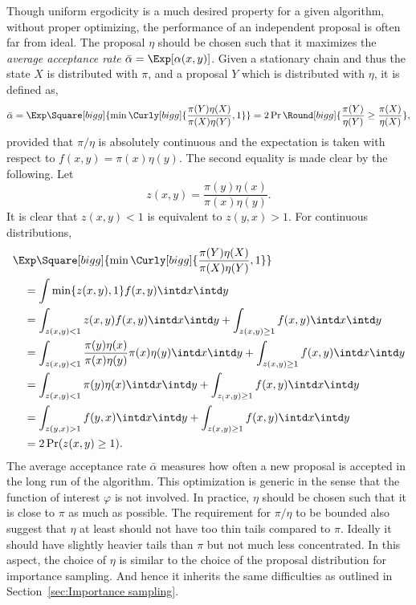 Though uniform ergodicity is a much desired property for a given algorithm,
without proper optimizing, the performance of an independent proposal is often
far from ideal. The proposal $\eta$ should be chosen such that it maximizes the
\emph{average acceptance rate} $\bar\alpha = \Exp[\alpha(x,y)]$. Given a
stationary chain and thus the state $X$ is distributed with $\pi$, and a
proposal $Y$ which is distributed with $\eta$, it is defined as,
\begin{equation}
  \bar\alpha
  = \Exp\Square[bigg]{\min\Curly[bigg]{\frac{\pi(Y)\eta(X)}{\pi(X)\eta(Y)},1}}
  = 2\Pr\Round[bigg]{\frac{\pi(Y)}{\eta(Y)}\ge\frac{\pi(X)}{\eta(X)}},
\end{equation}
provided that $\pi/\eta$ is absolutely continuous and the expectation is taken
with respect to $f(x,y) = \pi(x)\eta(y)$. The second equality is made clear by
the following. Let
\begin{equation*}
  z(x,y) = \frac{\pi(y)\eta(x)}{\pi(x)\eta(y)}.
\end{equation*}
It is clear that $z(x,y) < 1$ is equivalent to $z(y,x)>1$. For continuous
distributions,
\begin{align*}
  &\Exp\Square[bigg]{\min\Curly[bigg]{\frac{\pi(Y)\eta(X)}{\pi(X)\eta(Y)},1}}
  \\
  &\quad= \int \min\{z(x,y),1\} f(x,y)\intd x \intd y \\
  &\quad= \int_{z(x,y) < 1} z(x,y)f(x,y) \intd x \intd y
  + \int_{z(x,y)\ge1} f(x,y)\intd x \intd y \\
  &\quad= \int_{z(x,y) < 1} \frac{\pi(y)\eta(x)}{\pi(x)\eta(y)}
  \pi(x)\eta(y) \intd x \intd y
  + \int_{z(x,y) \ge 1} f(x,y)\intd x \intd y \\
  &\quad= \int_{z(x,y) < 1} \pi(y)\eta(x) \intd x \intd y
  + \int_{z_(x,y)\ge1} f(x,y)\intd x \intd y \\
  &\quad= \int_{z(y,x) > 1} f(y, x) \intd x \intd y
  + \int_{z(x,y)\ge1} f(x,y) \intd x \intd y \\
  &\quad= 2\Pr(z(x,y)\ge1).
\end{align*}
The average acceptance rate $\bar\alpha$ measures how often a new proposal is
accepted in the long run of the algorithm. This optimization is generic in the
sense that the function of interest $\varphi$ is not involved. In practice,
$\eta$ should be chosen such that it is close to $\pi$ as much as possible.
The requirement for $\pi/\eta$ to be bounded also suggest that $\eta$ at least
should not have too thin tails compared to $\pi$.  Ideally it should have
slightly heavier tails than $\pi$ but not much less concentrated. In this
aspect, the choice of $\eta$ is similar to the choice of the proposal
distribution for importance sampling. And hence it inherits the same
difficulties as outlined in Section~\ref{sec:Importance sampling}.

